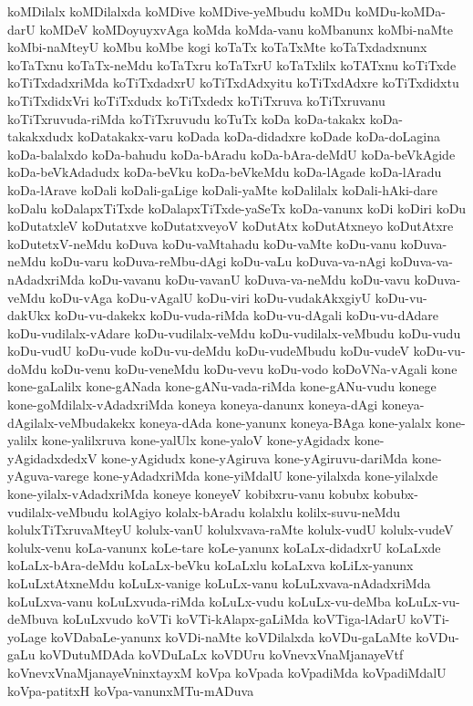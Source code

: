 {koMDilalx
koMDilalxda
koMDive
koMDive-yeMbudu
koMDu
koMDu-koMDa-darU
koMDeV
koMDoyuyxvAga
koMda
koMda-vanu
koMbanunx
koMbi-naMte
koMbi-naMteyU
koMbu
koMbe
kogi
koTaTx
koTaTxMte
koTaTxdadxnunx
koTaTxnu
koTaTx-neMdu
koTaTxru
koTaTxrU
koTaTxlilx
koTATxnu
koTiTxde
koTiTxdadxriMda
koTiTxdadxrU
koTiTxdAdxyitu
koTiTxdAdxre
koTiTxdidxtu
koTiTxdidxVri
koTiTxdudx
koTiTxdedx
koTiTxruva
koTiTxruvanu
koTiTxruvuda-riMda
koTiTxruvudu
koTuTx
koDa
koDa-takakx
koDa-takakxdudx
koDatakakx-varu
koDada
koDa-didadxre
koDade
koDa-doLagina
koDa-balalxdo
koDa-bahudu
koDa-bAradu
koDa-bAra-deMdU
koDa-beVkAgide
koDa-beVkAdadudx
koDa-beVku
koDa-beVkeMdu
koDa-lAgade
koDa-lAradu
koDa-lArave
koDali
koDali-gaLige
koDali-yaMte
koDalilalx
koDali-hAki-dare
koDalu
koDalapxTiTxde
koDalapxTiTxde-yaSeTx
koDa-vanunx
koDi
koDiri
koDu
koDutatxleV
koDutatxve
koDutatxveyoV
koDutAtx
koDutAtxneyo
koDutAtxre
koDutetxV-neMdu
koDuva
koDu-vaMtahadu
koDu-vaMte
koDu-vanu
koDuva-neMdu
koDu-varu
koDuva-reMbu-dAgi
koDu-vaLu
koDuva-va-nAgi
koDuva-va-nAdadxriMda
koDu-vavanu
koDu-vavanU
koDuva-va-neMdu
koDu-vavu
koDuva-veMdu
koDu-vAga
koDu-vAgalU
koDu-viri
koDu-vudakAkxgiyU
koDu-vu-dakUkx
koDu-vu-dakekx
koDu-vuda-riMda
koDu-vu-dAgali
koDu-vu-dAdare
koDu-vudilalx-vAdare
koDu-vudilalx-veMdu
koDu-vudilalx-veMbudu
koDu-vudu
koDu-vudU
koDu-vude
koDu-vu-deMdu
koDu-vudeMbudu
koDu-vudeV
koDu-vu-doMdu
koDu-venu
koDu-veneMdu
koDu-vevu
koDu-vodo
koDoVNa-vAgali
kone
kone-gaLalilx
kone-gANada
kone-gANu-vada-riMda
kone-gANu-vudu
konege
kone-goMdilalx-vAdadxriMda
koneya
koneya-danunx
koneya-dAgi
koneya-dAgilalx-veMbudakekx
koneya-dAda
kone-yanunx
koneya-BAga
kone-yalalx
kone-yalilx
kone-yalilxruva
kone-yalUlx
kone-yaloV
kone-yAgidadx
kone-yAgidadxdedxV
kone-yAgidudx
kone-yAgiruva
kone-yAgiruvu-dariMda
kone-yAguva-varege
kone-yAdadxriMda
kone-yiMdalU
kone-yilalxda
kone-yilalxde
kone-yilalx-vAdadxriMda
koneye
koneyeV
kobibxru-vanu
kobubx
kobubx-vudilalx-veMbudu
kolAgiyo
kolalx-bAradu
kolalxlu
kolilx-suvu-neMdu
kolulxTiTxruvaMteyU
kolulx-vanU
kolulxvava-raMte
kolulx-vudU
kolulx-vudeV
kolulx-venu
koLa-vanunx
koLe-tare
koLe-yanunx
koLaLx-didadxrU
koLaLxde
koLaLx-bAra-deMdu
koLaLx-beVku
koLaLxlu
koLaLxva
koLiLx-yanunx
koLuLxtAtxneMdu
koLuLx-vanige
koLuLx-vanu
koLuLxvava-nAdadxriMda
koLuLxva-vanu
koLuLxvuda-riMda
koLuLx-vudu
koLuLx-vu-deMba
koLuLx-vu-deMbuva
koLuLxvudo
koVTi
koVTi-kAlapx-gaLiMda
koVTiga-lAdarU
koVTi-yoLage
koVDabaLe-yanunx
koVDi-naMte
koVDilalxda
koVDu-gaLaMte
koVDu-gaLu
koVDutuMDAda
koVDuLaLx
koVDUru
koVnevxVnaMjanayeVtf
koVnevxVnaMjanayeVninxtayxM
koVpa
koVpada
koVpadiMda
koVpadiMdalU
koVpa-patitxH
koVpa-vanunxMTu-mADuva
}
